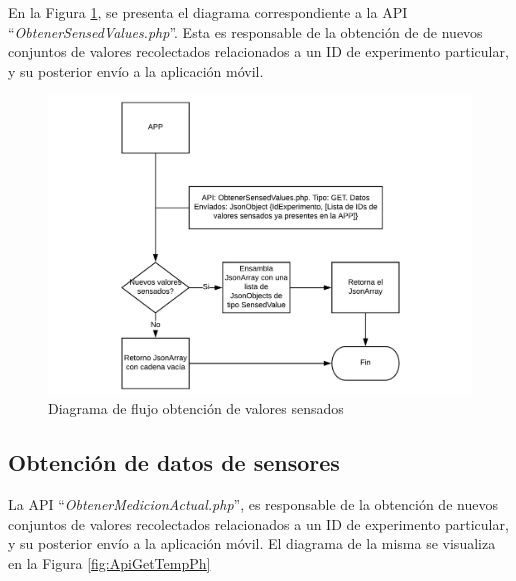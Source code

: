         \par En la Figura \ref{fig:ApiGet}, se presenta el diagrama correspondiente a la API ``\textit{ObtenerSensedValues.php}''. Esta es responsable de la obtención de de nuevos conjuntos de valores recolectados relacionados a un ID de experimento particular, y su posterior envío a la aplicación móvil.
            \begin{figure}[h]
                \centering
                \includegraphics [scale=0.50] {DiagramaAPIGet.pdf}
                \caption{Diagrama de flujo obtención de valores sensados}
                \label{fig:ApiGet}
            \end{figure}
        
        \subsection{Obtención de datos de sensores}
        \par La API ``\textit{ObtenerMedicionActual.php}'', es responsable de la obtención de nuevos conjuntos de valores recolectados relacionados a un ID de experimento particular, y su posterior envío a la aplicación móvil. El diagrama de la misma se visualiza en la Figura \ref{fig:ApiGetTempPh}
        
